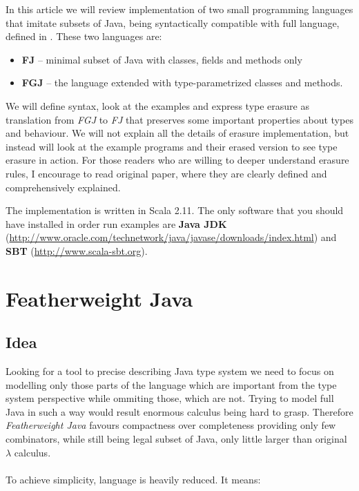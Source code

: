 \documentclass{article}[12pt]
\begin{document}
In this article we will review implementation of two small
programming languages that imitate subsets of Java, being
syntactically compatible with full language, defined in
\cite{fj}. These two languages are:

\begin{itemize}
\item{\textbf{FJ}} -- minimal subset of Java with classes,
fields and methods only
\item{\textbf{FGJ}} -- the language extended with
type-parametrized classes and methods.
\end{itemize}


We will define syntax, look at the examples and express type
erasure as translation from \emph{FGJ} to \emph{FJ} that
preserves some important properties about types and behaviour.
We will not explain all the details of erasure implementation,
but instead will look at the example programs and their erased
version to see type erasure in action. For those readers who
are willing to deeper understand erasure rules, I encourage
to read original paper, where they are clearly defined and
comprehensively explained.

The implementation is written in Scala 2.11. The only software
that you should have installed in order run examples are
\textbf{Java JDK}
(\url{http://www.oracle.com/technetwork/java/javase/downloads/index.html})
and \textbf{SBT} (\url{http://www.scala-sbt.org}).

\section{Featherweight Java}

\subsection{Idea}

Looking for a tool to precise describing Java type system we need
to focus on modelling only those parts of the language which are
important from the type system perspective while ommiting those,
which are not. Trying to model full Java in such a way would result
enormous calculus being hard to grasp. Therefore
\emph{Featherweight Java} favours compactness over completeness
providing only few combinators, while still being legal subset
of Java, only little larger than original $\lambda$ calculus.
\\
\\
To achieve simplicity, language is heavily reduced. It means:
\end{document}
